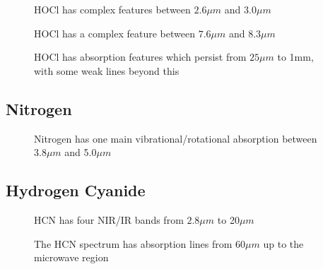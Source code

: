 \documentclass[12pt]{article}
\begin{document}
\vspace*{11.5cm}
\begin{figure}[htb]
\caption{HOCl has complex features between   $2.6\mu m$
 and 3.0$\mu m$}
\end{figure}
\newpage

\vspace*{11.5cm}
\begin{figure}[htb]
\caption{HOCl has a complex feature between   $7.6\mu m$
 and 8.3$\mu m$}
\end{figure}
\newpage



\vspace*{11.5cm}
\begin{figure}[htb]
\caption{HOCl has absorption features which persist from $25\mu m$
 to 1mm, with some weak lines beyond this}
\end{figure}
\newpage


\subsection{Nitrogen}

\vspace*{11.5cm}
\begin{figure}[htb]
\caption{Nitrogen has one main vibrational/rotational absorption between  $3.8\mu m$
 and 5.0$\mu m$}
\end{figure}
\newpage


\subsection{Hydrogen Cyanide}

\vspace*{11.5cm}
\begin{figure}[htb]
\caption{HCN has four NIR/IR bands from $2.8\mu m$
to  20$\mu m$}
\end{figure}
\newpage


\vspace*{11.5cm}
\begin{figure}[htb]
\caption{The HCN spectrum has absorption lines from $60\mu m$
up to the microwave region}
\end{figure}
\newpage
\end{document}
